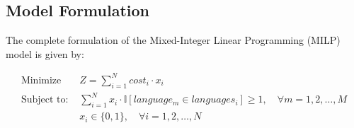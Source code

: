 \documentclass{article}
\begin{document}
\subsection*{Model Formulation}
The complete formulation of the Mixed-Integer Linear Programming (MILP) model is given by:

\begin{align*}
\text{Minimize } & Z = \sum_{i=1}^{N} cost_i \cdot x_i \\
\text{Subject to: } & \sum_{i=1}^{N} x_i \cdot \mathbb{I}[language_m \in languages_i] \geq 1, \quad \forall m = 1, 2, \ldots, M \\
& x_i \in \{0, 1\}, \quad \forall i = 1, 2, \ldots, N
\end{align*}
\end{document}
